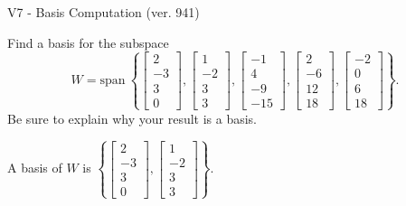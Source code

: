 \begin{exercise}
  \begin{exerciseTitle}V7 - Basis Computation (ver. 941)\end{exerciseTitle}
  \begin{exerciseStatement}
    Find a basis for the subspace 
\[W=\mathrm{span}\ \left\{\left[\begin{array}{r}
2 \\
-3 \\
3 \\
0
\end{array}\right] , \left[\begin{array}{r}
1 \\
-2 \\
3 \\
3
\end{array}\right] , \left[\begin{array}{r}
-1 \\
4 \\
-9 \\
-15
\end{array}\right] , \left[\begin{array}{r}
2 \\
-6 \\
12 \\
18
\end{array}\right] , \left[\begin{array}{r}
-2 \\
0 \\
6 \\
18
\end{array}\right]\right\}.\]
 Be sure to explain why your result is a basis.


  \end{exerciseStatement}
  \begin{exerciseAnswer}
   A basis of \(W\) is  \(\left\{\left[\begin{array}{r}
2 \\
-3 \\
3 \\
0
\end{array}\right] , \left[\begin{array}{r}
1 \\
-2 \\
3 \\
3
\end{array}\right]\right\}\).
  


  \end{exerciseAnswer}
\end{exercise}